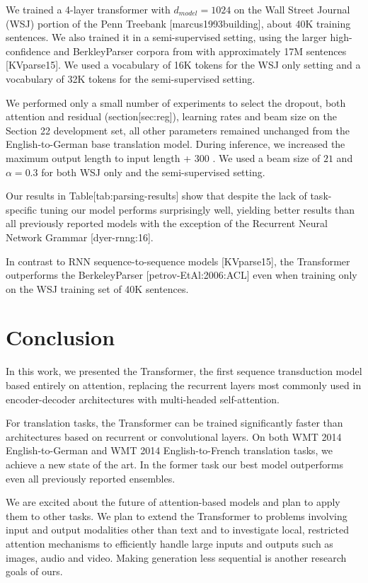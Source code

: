 \documentclass[11pt,a4paper]{article}
\begin{document}
We trained a 4-layer transformer with  $d_{model} = 1024$  on the Wall Street Journal (WSJ) portion of the Penn Treebank [marcus1993building], about 40K training sentences. We also trained it in a semi-supervised setting, using the larger high-confidence and BerkleyParser corpora from with approximately 17M sentences [KVparse15]. We used a vocabulary of 16K tokens for the WSJ only setting and a vocabulary of 32K tokens for the semi-supervised setting.

We performed only a small number of experiments to select the dropout, both attention and residual (section[sec:reg]), learning rates and beam size on the Section 22 development set, all other parameters remained unchanged from the English-to-German base translation model. During inference, we increased the maximum output length to input length +  $300$ . We used a beam size of  $21$  and  $\alpha=0.3$  for both WSJ only and the semi-supervised setting.

Our results in Table[tab:parsing-results] show that despite the lack of task-specific tuning our model performs surprisingly well, yielding better results than all previously reported models with the exception of the Recurrent Neural Network Grammar [dyer-rnng:16].

In contrast to RNN sequence-to-sequence models [KVparse15], the Transformer outperforms the BerkeleyParser [petrov-EtAl:2006:ACL] even when training only on the WSJ training set of 40K sentences.

\section{Conclusion}

In this work, we presented the Transformer, the first sequence transduction model based entirely on attention, replacing the recurrent layers most commonly used in encoder-decoder architectures with multi-headed self-attention.

For translation tasks, the Transformer can be trained significantly faster than architectures based on recurrent or convolutional layers. On both WMT 2014 English-to-German and WMT 2014 English-to-French translation tasks, we achieve a new state of the art. In the former task our best model outperforms even all previously reported ensembles.

We are excited about the future of attention-based models and plan to apply them to other tasks. We plan to extend the Transformer to problems involving input and output modalities other than text and to investigate local, restricted attention mechanisms to efficiently handle large inputs and outputs such as images, audio and video. Making generation less sequential is another research goals of ours.
\end{document}
